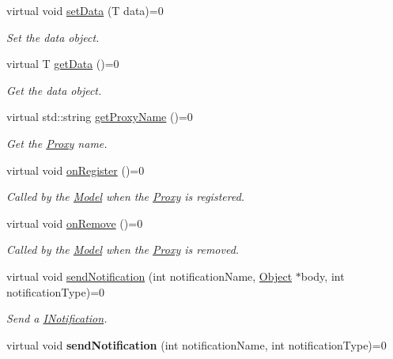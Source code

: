 \begin{DoxyCompactItemize}
\item 
virtual void \hyperlink{class_pure_m_v_c_1_1_i_proxy_templated_aef201c3df1efc6c2652f5de3ba0fff74}{setData} (T data)=0
\begin{DoxyCompactList}\small\item\em Set the data object. \item\end{DoxyCompactList}\item 
virtual T \hyperlink{class_pure_m_v_c_1_1_i_proxy_templated_ab6cf7f1c41002c84a7f48d65b0d2e388}{getData} ()=0
\begin{DoxyCompactList}\small\item\em Get the data object. \item\end{DoxyCompactList}\item 
virtual std::string \hyperlink{class_pure_m_v_c_1_1_i_proxy_restricted_ae52c8f9de4c2f4a4b90e97006e0b08f9}{getProxyName} ()=0
\begin{DoxyCompactList}\small\item\em Get the \hyperlink{class_pure_m_v_c_1_1_proxy}{Proxy} name. \item\end{DoxyCompactList}\item 
virtual void \hyperlink{class_pure_m_v_c_1_1_i_proxy_restricted_a450f14bba0bde7c94e5868e844f1fdf2}{onRegister} ()=0
\begin{DoxyCompactList}\small\item\em Called by the \hyperlink{class_pure_m_v_c_1_1_model}{Model} when the \hyperlink{class_pure_m_v_c_1_1_proxy}{Proxy} is registered. \item\end{DoxyCompactList}\item 
virtual void \hyperlink{class_pure_m_v_c_1_1_i_proxy_restricted_a6d883fcf5a5e241321f5b5d9521ba158}{onRemove} ()=0
\begin{DoxyCompactList}\small\item\em Called by the \hyperlink{class_pure_m_v_c_1_1_model}{Model} when the \hyperlink{class_pure_m_v_c_1_1_proxy}{Proxy} is removed. \item\end{DoxyCompactList}\item 
virtual void \hyperlink{class_pure_m_v_c_1_1_i_notifier_a65e8333ccfea74138b79f84dac96af25}{sendNotification} (int notificationName, \hyperlink{class_pure_m_v_c_1_1_object}{Object} $\ast$body, int notificationType)=0
\begin{DoxyCompactList}\small\item\em Send a {\ttfamily \hyperlink{class_pure_m_v_c_1_1_i_notification}{INotification}}. \item\end{DoxyCompactList}\item 
\hypertarget{class_pure_m_v_c_1_1_i_notifier_ad9421945c1e0fd6d7ebbc136f9ecfba3}{
virtual void {\bfseries sendNotification} (int notificationName, int notificationType)=0}
\label{class_pure_m_v_c_1_1_i_notifier_ad9421945c1e0fd6d7ebbc136f9ecfba3}


\end{DoxyCompactItemize}

